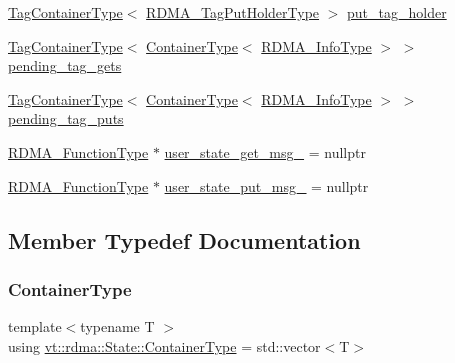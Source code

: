 \begin{DoxyCompactItemize}
\hyperlink{structvt_1_1rdma_1_1_state_ad84b403803cc575ef54d0d0ac74017e9}{Tag\+Container\+Type}$<$ \hyperlink{structvt_1_1rdma_1_1_state_a8a25176f05bb2570889d6b41089ac1ca}{R\+D\+M\+A\+\_\+\+Tag\+Put\+Holder\+Type} $>$ \hyperlink{structvt_1_1rdma_1_1_state_aed4540b539aa2d8e86f83f235c0722ad}{put\+\_\+tag\+\_\+holder}
\item 
\hyperlink{structvt_1_1rdma_1_1_state_ad84b403803cc575ef54d0d0ac74017e9}{Tag\+Container\+Type}$<$ \hyperlink{structvt_1_1rdma_1_1_state_a7506401f1846be85f14e73e75b773a5d}{Container\+Type}$<$ \hyperlink{structvt_1_1rdma_1_1_state_a6a78216795efe7fb6966c33b1a21d7cf}{R\+D\+M\+A\+\_\+\+Info\+Type} $>$ $>$ \hyperlink{structvt_1_1rdma_1_1_state_ac2da68e9bf531013beb9b5d903e0143f}{pending\+\_\+tag\+\_\+gets}
\item 
\hyperlink{structvt_1_1rdma_1_1_state_ad84b403803cc575ef54d0d0ac74017e9}{Tag\+Container\+Type}$<$ \hyperlink{structvt_1_1rdma_1_1_state_a7506401f1846be85f14e73e75b773a5d}{Container\+Type}$<$ \hyperlink{structvt_1_1rdma_1_1_state_a6a78216795efe7fb6966c33b1a21d7cf}{R\+D\+M\+A\+\_\+\+Info\+Type} $>$ $>$ \hyperlink{structvt_1_1rdma_1_1_state_a3acc777f93b5618bba0a7626e661578c}{pending\+\_\+tag\+\_\+puts}
\item 
\hyperlink{structvt_1_1rdma_1_1_state_afc917e98beaf9cde735f096552029f3a}{R\+D\+M\+A\+\_\+\+Function\+Type} $\ast$ \hyperlink{structvt_1_1rdma_1_1_state_af4ac112689f3a20eb497684c9116a291}{user\+\_\+state\+\_\+get\+\_\+msg\+\_\+} = nullptr
\item 
\hyperlink{structvt_1_1rdma_1_1_state_afc917e98beaf9cde735f096552029f3a}{R\+D\+M\+A\+\_\+\+Function\+Type} $\ast$ \hyperlink{structvt_1_1rdma_1_1_state_a852d64bdbb01a281df8635479bceb460}{user\+\_\+state\+\_\+put\+\_\+msg\+\_\+} = nullptr
\end{DoxyCompactItemize}


\subsection{Member Typedef Documentation}
\mbox{\label{structvt_1_1rdma_1_1_state_a7506401f1846be85f14e73e75b773a5d}} 
\subsubsection{\texorpdfstring{Container\+Type}{ContainerType}}
{\footnotesize\ttfamily template$<$typename T $>$ \\
using \hyperlink{structvt_1_1rdma_1_1_state_a7506401f1846be85f14e73e75b773a5d}{vt\+::rdma\+::\+State\+::\+Container\+Type} =  std\+::vector$<$T$>$}

